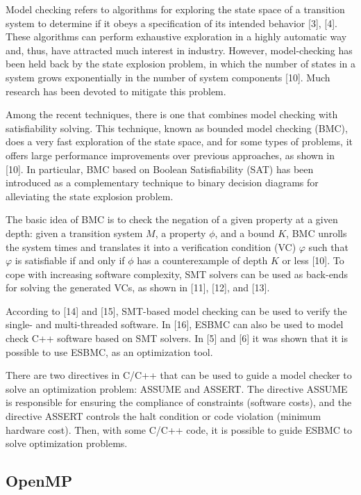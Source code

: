 Model checking refers to algorithms for exploring the state space of a transition system to determine if it obeys a speciﬁcation of its intended behavior [3], [4]. These algorithms can perform exhaustive exploration in a highly automatic way and, thus, have attracted much interest in industry. However, model-checking has been held back by the state explosion problem, in which the number of states in a system grows exponentially in the number of system components [10]. Much research has been devoted to mitigate this problem.

Among the recent techniques, there is one that combines model checking with satisﬁability solving. This technique, known as bounded model checking (BMC), does a very fast exploration of the state space, and for some types of problems, it offers large performance improvements over previous approaches, as shown in [10]. In particular, BMC based on Boolean Satisfiability (SAT) has been introduced as a complementary technique to binary decision diagrams for alleviating the state explosion problem. 

The basic idea of BMC is to check the negation of a given property at a given depth: given a transition system $ M $, a property $ \phi $, and a bound $ K $, BMC unrolls the system  times and translates it into a verification condition (VC) $ \varphi $  such that $ \varphi $   is satisfiable if and only if $ \phi $ has a counterexample of depth $ K $ or less [10]. To cope with increasing software complexity, SMT solvers can be used as back-ends for solving the generated VCs, as shown in [11], [12], and [13]. 

According to [14] and [15], SMT-based model checking can be used to verify the single- and multi-threaded software. In [16], ESBMC can also be used to model check C++ software based on SMT solvers. In [5] and [6] it was shown that it is possible to use ESBMC, as an optimization tool.

There are two directives in C/C++ that can be used to guide a model checker to solve an optimization problem: ASSUME and ASSERT. The directive ASSUME is responsible for ensuring the compliance of constraints (software costs), and the directive ASSERT controls the halt condition or code violation (minimum hardware cost). Then, with some C/C++ code, it is possible to guide ESBMC to solve optimization problems.

\subsection{OpenMP}

